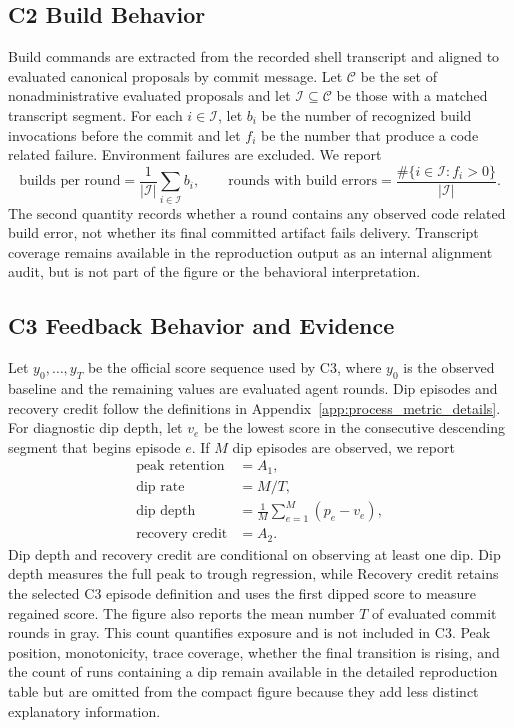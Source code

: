 \subsection{C2 Build Behavior}

Build commands are extracted from the recorded shell transcript and aligned to evaluated canonical proposals by commit message.  Let \(\mathcal C\) be the set of nonadministrative evaluated proposals and let \(\mathcal I\subseteq\mathcal C\) be those with a matched transcript segment.  For each \(i\in\mathcal I\), let \(b_i\) be the number of recognized build invocations before the commit and let \(f_i\) be the number that produce a code related failure.  Environment failures are excluded.  We report
\[
\text{builds per round}
=\frac{1}{|\mathcal I|}\sum_{i\in\mathcal I}b_i,
\qquad
\text{rounds with build errors}
=\frac{\#\{i\in\mathcal I:f_i>0\}}{|\mathcal I|}.
\]
The second quantity records whether a round contains any observed code related build error, not whether its final committed artifact fails delivery.  Transcript coverage remains available in the reproduction output as an internal alignment audit, but is not part of the figure or the behavioral interpretation.

\subsection{C3 Feedback Behavior and Evidence}

Let \(y_0,\ldots,y_T\) be the official score sequence used by C3, where \(y_0\) is the observed baseline and the remaining values are evaluated agent rounds.  Dip episodes and recovery credit follow the definitions in Appendix~\ref{app:process_metric_details}.  For diagnostic dip depth, let \(v_e\) be the lowest score in the consecutive descending segment that begins episode \(e\).  If \(M\) dip episodes are observed, we report
\[
\begin{aligned}
\text{peak retention} & = A_1,\\
\text{dip rate} & = M/T,\\
\text{dip depth} & =
\frac{1}{M}\sum_{e=1}^{M}(p_e-v_e),\\
\text{recovery credit} & = A_2.
\end{aligned}
\]
Dip depth and recovery credit are conditional on observing at least one dip.  Dip depth measures the full peak to trough regression, while Recovery credit retains the selected C3 episode definition and uses the first dipped score to measure regained score.  The figure also reports the mean number \(T\) of evaluated commit rounds in gray.  This count quantifies exposure and is not included in C3.  Peak position, monotonicity, trace coverage, whether the final transition is rising, and the count of runs containing a dip remain available in the detailed reproduction table but are omitted from the compact figure because they add less distinct explanatory information.





